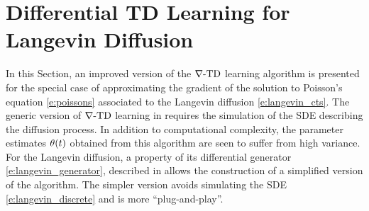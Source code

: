 \section{Differential TD Learning for Langevin Diffusion}
\label{s:diff_td_langevin}
In this Section, an improved version of the $\nabla\text{-TD}$ learning algorithm is presented for the special case of approximating the gradient of the solution to Poisson's equation \eqref{e:poissons} associated to the Langevin diffusion \eqref{e:langevin_cts}. The generic version of $\nabla\text{-TD}$ learning in  requires the simulation of the SDE describing the diffusion process.  In addition to computational complexity, the parameter estimates $\theta(t)$ obtained from this algorithm are seen to suffer from high variance. For the Langevin diffusion, a property of its differential generator \eqref{e:langevin_generator},  described in  allows the construction of a simplified version of the algorithm. The simpler version avoids simulating the SDE \eqref{e:langevin_discrete} and is more ``plug-and-play''. 

